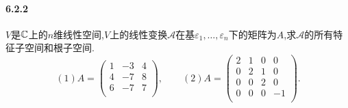 \documentclass[11pt]{article}
\begin{document}
\paragraph{6.2.2}$V$是$\mathbb{C}$上的$n$维线性空间,$V$上的线性变换$\mathscr{A}$在基$\varepsilon_1,\dots,\varepsilon_n$下的矩阵为$A$,求$\mathscr{A}$的所有特征子空间和根子空间.
$$(1)A=\begin{pmatrix}
    1 & -3 & 4 \\
    4 & -7 & 8 \\
    6 & -7 & 7 \\
\end{pmatrix},\qquad (2)A=\begin{pmatrix}
    2 & 1 & 0 & 0 \\
    0 & 2 & 1 & 0 \\
    0 & 0 & 2 & 0 \\
    0 & 0 & 0 & -1 \\
\end{pmatrix}.$$
\end{document}
